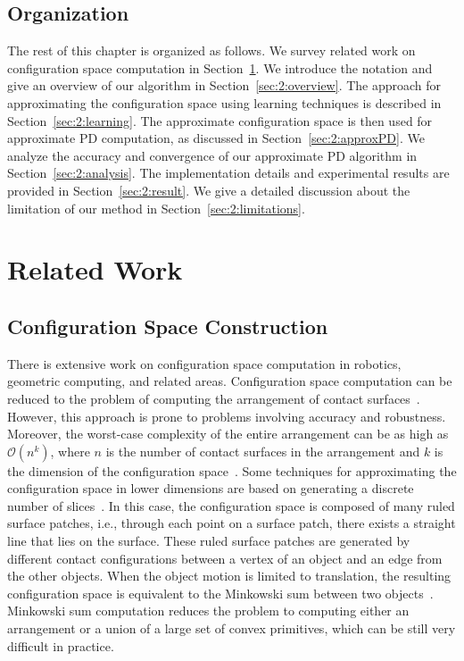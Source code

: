\subsection{Organization}
The rest of this chapter is organized as follows. We survey related work on configuration space computation in Section~\ref{sec:2:related}. We introduce the notation and give an overview of our algorithm in Section~\ref{sec:2:overview}. The approach for approximating the configuration space using learning techniques is described in Section~\ref{sec:2:learning}. The approximate configuration space is then used for approximate PD computation, as discussed in Section~\ref{sec:2:approxPD}. We analyze the accuracy and convergence of our approximate PD algorithm in Section~\ref{sec:2:analysis}. The implementation details and experimental results are provided in Section~\ref{sec:2:result}. We give a detailed discussion about the limitation of our method in Section~\ref{sec:2:limitations}.

\section{Related Work}
\label{sec:2:related}
\subsection{Configuration Space Construction}
There is extensive work on configuration space computation in robotics, geometric computing, and related areas.
Configuration space computation can be reduced to the problem of computing the arrangement of contact surfaces~\cite{Varadhan:2006:TPA}.
However, this approach is prone to problems involving accuracy and robustness. Moreover, the worst-case complexity of the entire arrangement can be as high as $\mathcal O(n^k)$, where $n$ is the number of contact surfaces in the arrangement and $k$ is the dimension of the configuration space~\cite{Goodman:Rourke:1997}. Some techniques for approximating the configuration space in lower dimensions are based on generating a discrete number of slices~\cite{Sacks:SCS:1997}. In this case, the configuration space is composed of many ruled surface patches, i.e., through each point on a surface patch, there exists a straight line that lies on the surface. These ruled surface patches are generated by different contact configurations between a vertex of an object and an edge from the other objects. When the object motion is limited to translation, the resulting configuration space is equivalent to the Minkowski sum between two objects~\cite{Leonidas:CCRS:1987,LPT:SpatialPlanning:1983}. Minkowski sum computation reduces the problem to computing either an arrangement or a union of a large set of convex primitives, which can be still very difficult in practice.

